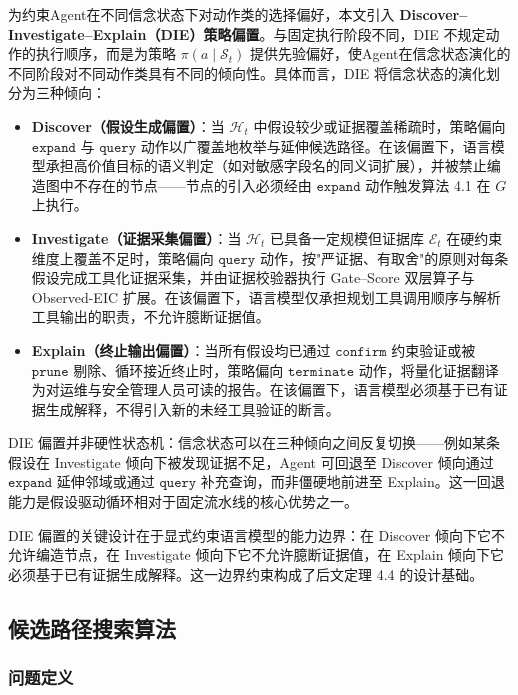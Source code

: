 \documentclass[a4paper,12pt]{ctexart}
\begin{document}
为约束Agent在不同信念状态下对动作类的选择偏好，本文引入 \textbf{Discover–Investigate–Explain（DIE）策略偏置}。与固定执行阶段不同，DIE 不规定动作的执行顺序，而是为策略 $\pi(a \mid \mathcal{S}_t)$ 提供先验偏好，使Agent在信念状态演化的不同阶段对不同动作类具有不同的倾向性。具体而言，DIE 将信念状态的演化划分为三种倾向：

\begin{itemize}[leftmargin=*]
\item \textbf{Discover（假设生成偏置）}：当 $\mathcal{H}_t$ 中假设较少或证据覆盖稀疏时，策略偏向 $\texttt{expand}$ 与 $\texttt{query}$ 动作以广覆盖地枚举与延伸候选路径。在该偏置下，语言模型承担高价值目标的语义判定（如对敏感字段名的同义词扩展），并被禁止编造图中不存在的节点——节点的引入必须经由 $\texttt{expand}$ 动作触发算法 4.1 在 $G$ 上执行。
\item \textbf{Investigate（证据采集偏置）}：当 $\mathcal{H}_t$ 已具备一定规模但证据库 $\mathcal{E}_t$ 在硬约束维度上覆盖不足时，策略偏向 $\texttt{query}$ 动作，按"严证据、有取舍"的原则对每条假设完成工具化证据采集，并由证据校验器执行 Gate–Score 双层算子与 Observed-EIC 扩展。在该偏置下，语言模型仅承担规划工具调用顺序与解析工具输出的职责，不允许臆断证据值。
\item \textbf{Explain（终止输出偏置）}：当所有假设均已通过 $\texttt{confirm}$ 约束验证或被 $\texttt{prune}$ 剔除、循环接近终止时，策略偏向 $\texttt{terminate}$ 动作，将量化证据翻译为对运维与安全管理人员可读的报告。在该偏置下，语言模型必须基于已有证据生成解释，不得引入新的未经工具验证的断言。
\end{itemize}

DIE 偏置并非硬性状态机：信念状态可以在三种倾向之间反复切换——例如某条假设在 Investigate 倾向下被发现证据不足，Agent 可回退至 Discover 倾向通过 $\texttt{expand}$ 延伸邻域或通过 $\texttt{query}$ 补充查询，而非僵硬地前进至 Explain。这一回退能力是假设驱动循环相对于固定流水线的核心优势之一。

DIE 偏置的关键设计在于显式约束语言模型的能力边界：在 Discover 倾向下它不允许编造节点，在 Investigate 倾向下它不允许臆断证据值，在 Explain 倾向下它必须基于已有证据生成解释。这一边界约束构成了后文定理 4.4 的设计基础。

\subsection{候选路径搜索算法}

\subsubsection{问题定义}
\end{document}
